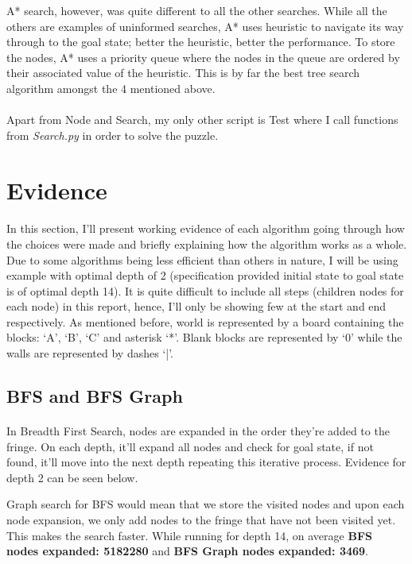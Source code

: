 \documentclass[10pt]{article}
\begin{document}
  A* search, however, was quite different to all the other searches. While all the others are examples of uninformed searches, A* uses heuristic to navigate its way through to the goal state; better the heuristic, better the performance. To store the nodes, A* uses a priority queue where the nodes in the queue are ordered by their associated value of the heuristic. This is by far the best tree search algorithm amongst the 4 mentioned above. \\ \\
Apart from Node and Search, my only other script is Test where I call functions from \textit{Search.py} in order to solve the puzzle.

  \section{Evidence}
  \paragraph{} \indent
  In this section, I’ll present working evidence of each algorithm going through how the choices were made and briefly explaining how the algorithm works as a whole. Due to some algorithms being less efficient than others in nature, I will be using example with optimal depth of 2 (specification provided initial state to goal state is of optimal depth 14).  It is quite difficult to include all steps (children nodes for each node) in this report, hence, I’ll only be showing few at the start and end respectively. As mentioned before, world is represented by a board containing the blocks: `A', `B', `C' and asterisk `*'. Blank blocks are represented by `0' while the walls are represented by dashes `|'.

  \subsection{BFS and BFS Graph}
  \paragraph{} \indent
  In Breadth First Search, nodes are expanded in the order they’re added to the fringe. On each depth, it’ll expand all nodes and check for goal state, if not found, it’ll move into the next depth repeating this iterative process. Evidence for depth 2 can be seen below. 

  Graph search for BFS would mean that we store the visited nodes and upon each node expansion, we only add nodes to the fringe that have not been visited yet. This makes the search faster.
  While running for depth 14, on average \textbf{BFS nodes expanded: 5182280} and \textbf{BFS Graph nodes expanded: 3469}.
\end{document}
